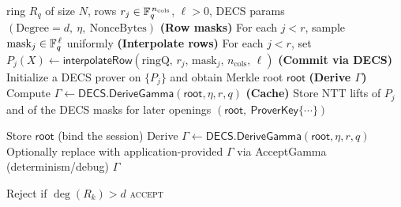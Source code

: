 \begin{algorithm}[H]
\caption{\textsf{LVCS.CommitInitWithParams}$(\mathrm{ringQ},\ \{r_j\}_{j<r},\ \ell,\ \mathrm{params})\to (\mathsf{root},\ \mathsf{ProverKey})$ \quad \emph{(Prover)}}
\begin{algorithmic}[1]
\Require ring $R_q$ of size $N$, rows $r_j\in\mathbb{F}_q^{\,n_{\mathrm{cols}}}$, $\ell>0$, DECS params $(\text{Degree}=d,\ \eta,\ \text{NonceBytes})$
\State \textbf{(Row masks)} For each $j<r$, sample $\mathrm{mask}_j\in\mathbb{F}_q^{\,\ell}$ uniformly 
\State \textbf{(Interpolate rows)} For each $j<r$, set $P_j(X)\gets\textsf{interpolateRow}(\mathrm{ringQ},\,r_j,\,\mathrm{mask}_j,\,n_{\mathrm{cols}},\,\ell)$
\State \textbf{(Commit via DECS)} Initialize a DECS prover on $\{P_j\}$ and obtain Merkle root $\mathsf{root}$
\State \textbf{(Derive $\Gamma$)} Compute $\Gamma\gets \textsf{DECS.DeriveGamma}(\mathsf{root},\eta,r,q)$
\State \textbf{(Cache)} Store NTT lifts of $P_j$ and of the DECS masks for later openings
\State \Return $(\mathsf{root},\ \mathsf{ProverKey}\{\cdots\})$
\end{algorithmic}
\end{algorithm}

\begin{algorithm}[H]
\caption{\textsf{LVCS.CommitStep1}$(\mathsf{root})\to \Gamma$ \quad and \quad \textsf{LVCS.AcceptGamma}$(\Gamma)$ \quad \emph{(Verifier)}}
\begin{algorithmic}[1]
\State Store $\mathsf{root}$ (bind the session)
\State Derive $\Gamma\gets \textsf{DECS.DeriveGamma}(\mathsf{root},\eta,r,q)$
\State Optionally replace with application-provided $\Gamma$ via \textsf{AcceptGamma} (determinism/debug)
\State \Return $\Gamma$
\end{algorithmic}
\end{algorithm}

\begin{algorithm}[H]
\caption{\textsf{LVCS.CommitStep2}$(\{R_k\}_{k<\eta})\to \{\textsc{accept},\textsc{reject}\}$ \quad \emph{(Verifier)}}
\begin{algorithmic}[1]
 
  \State Reject if $\deg(R_k) > d$ 
\EndFor
\State \Return \textsc{accept}
\end{algorithmic}
\end{algorithm}

